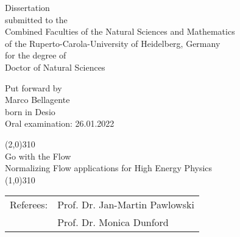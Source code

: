 \thispagestyle{empty}
\mbox{}
\vspace*{5mm}
\begin{center}
\sffamily
\large
Dissertation\\[1.5mm]
submitted to the\\[1.5mm] 
Combined Faculties of the Natural Sciences and Mathematics\\[1.5mm]
of the Ruperto-Carola-University of Heidelberg, Germany \\[1.5mm]
for the degree of \\[1.5mm]
Doctor of Natural Sciences


\vfill
{
\normalsize
Put forward by\\[1.5mm]
Marco Bellagente\\
born in Desio\\
Oral examination: 26.01.2022
}
\end{center}
\clearpage{\pagestyle{empty}\cleardoublepage}

\newpage
\thispagestyle{empty}
\mbox{}
\vspace*{3cm}
\sffamily
\begin{center}
\line(2,0){310}\\[3mm]
\Huge{Go with the Flow}\\[2mm]
\Large{Normalizing Flow applications for High Energy Physics}\\[3mm]
\line(1,0){310}
\end{center}


\vfill
\begin{tabular}{ll}
Referees: &  Prof. Dr. Jan-Martin Pawlowski\\[2mm]
               &  Prof. Dr. Monica Dunford \\
\end{tabular}

\rmfamily

\newpage